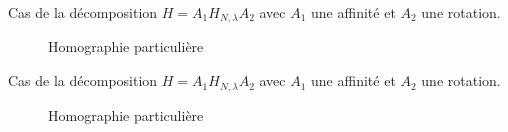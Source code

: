\documentclass[c,12pt]{beamer}
\newcommand{\Arrow}{{ \raisebox{10\height}{\scalebox{1}{$\longrightarrow$}}}}
\begin{document}
  \begin{frame}
  Cas de la décomposition $H=A_1H_{N,\lambda}A_2$ avec $A_1$ une affinité et $A_2$ une rotation.
  \begin{figure}
   \Arrow
   \caption{Homographie particulière}
  \end{figure}
  \end{frame}
  
  \begin{frame}
  Cas de la décomposition $H=A_1H_{N,\lambda}A_2$ avec $A_1$ une affinité et $A_2$ une rotation.
  \begin{figure}
   \Arrow
   \caption{Homographie particulière}
  \end{figure}
  \end{frame}
  
\end{document}
